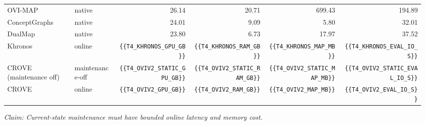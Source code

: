 \begin{table}[t]
\begin{tabular}{llrrrr}
\midrule
OVI-MAP & native & 26.14 & 20.71 & 699.43 & 194.89 \\
ConceptGraphs & native & 24.01 & 9.09 & 5.80 & 32.01 \\
DualMap & native & 23.80 & 6.73 & 17.97 & 37.52 \\
Khronos & online & \verb|{{T4_KHRONOS_GPU_GB}}| & \verb|{{T4_KHRONOS_RAM_GB}}| & \verb|{{T4_KHRONOS_MAP_MB}}| & \verb|{{T4_KHRONOS_EVAL_IO_S}}| \\
CROVE (maintenance off) & maintenance-off & \verb|{{T4_OVIV2_STATIC_GPU_GB}}| & \verb|{{T4_OVIV2_STATIC_RAM_GB}}| & \verb|{{T4_OVIV2_STATIC_MAP_MB}}| & \verb|{{T4_OVIV2_STATIC_EVAL_IO_S}}| \\
CROVE & online & \verb|{{T4_OVIV2_GPU_GB}}| & \verb|{{T4_OVIV2_RAM_GB}}| & \verb|{{T4_OVIV2_MAP_MB}}| & \verb|{{T4_OVIV2_EVAL_IO_S}}| \\
\bottomrule
\end{tabular}
\par
\smallskip
\noindent\textit{Claim: Current-state maintenance must have bounded online latency and memory cost.}
\end{table}

